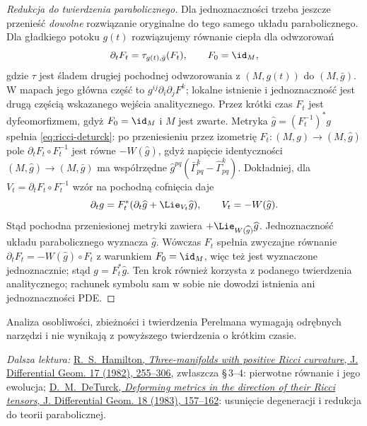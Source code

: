 \begin{proof}[Redukcja do twierdzenia parabolicznego]
Dla jednoznaczności trzeba jeszcze przenieść
\emph{dowolne} rozwiązanie oryginalne do tego samego
układu parabolicznego. Dla gładkiego potoku $g(t)$
rozwiązujemy równanie ciepła dla odwzorowań
\[
 \partial_tF_t=\tau_{g(t),\bar g}(F_t),
 \qquad F_0=\id_M,
\]
gdzie $\tau$ jest śladem drugiej pochodnej
odwzorowania z $(M,g(t))$ do $(M,\bar g)$.
W mapach jego główna część to
$g^{ij}\partial_i\partial_jF^k$; lokalne istnienie
i jednoznaczność jest drugą częścią wskazanego
wejścia analitycznego. Przez krótki czas $F_t$ jest
dyfeomorfizmem, gdyż $F_0=\id_M$ i $M$ jest zwarte.
Metryka $\widehat g=(F_t^{-1})^*g$ spełnia
\eqref{eq:ricci-deturck}: po przeniesieniu przez
izometrię $F_t:(M,g)\to(M,\widehat g)$ pole
$\partial_tF_t\circ F_t^{-1}$ jest równe
$-W(\widehat g)$, gdyż napięcie identyczności
$(M,\widehat g)\to(M,\bar g)$ ma współrzędne
$\widehat g^{pq}(\bar\Gamma^k_{pq}
-\widehat\Gamma^k_{pq})$.
Dokładniej, dla $V_t=\partial_tF_t\circ F_t^{-1}$
wzór na pochodną cofnięcia daje
\[
 \partial_tg=F_t^*(\partial_t\widehat g
                       +\Lie_{V_t}\widehat g),
 \qquad V_t=-W(\widehat g).
\]
Stąd pochodna przeniesionej metryki zawiera
$+\Lie_{W(\widehat g)}\widehat g$.
Jednoznaczność układu parabolicznego wyznacza
$\widehat g$. Wówczas $F_t$ spełnia zwyczajne
równanie $\partial_tF_t=-W(\widehat g)\circ F_t$
z warunkiem $F_0=\id_M$, więc też jest wyznaczone
jednoznacznie; stąd $g=F_t^*\widehat g$.
Ten krok również
korzysta z podanego twierdzenia analitycznego;
rachunek symbolu sam w sobie nie dowodzi istnienia
ani jednoznaczności PDE.
\end{proof}

Analiza osobliwości, zbieżności i twierdzenia Perelmana
wymagają odrębnych narzędzi i nie wynikają z powyższego
twierdzenia o krótkim czasie.

\par\smallskip
{\footnotesize\noindent\emph{Dalsza lektura:}
\href{https://projecteuclid.org/journals/journal-of-differential-geometry/volume-17/issue-2/Three-manifolds-with-positive-Ricci-curvature/10.4310/jdg/1214436922.full}
{R.\ S.\ Hamilton, \emph{Three-manifolds with positive Ricci
curvature}, J. Differential Geom. 17 (1982), 255--306},
zwłaszcza \S\,3--4: pierwotne równanie i jego ewolucja;
\href{https://projecteuclid.org/journals/journal-of-differential-geometry/volume-18/issue-1/Deforming-metrics-in-the-direction-of-their-Ricci-tensors/10.4310/jdg/1214509286.full}
{D.\ M.\ DeTurck, \emph{Deforming metrics in the direction
of their Ricci tensors}, J. Differential Geom. 18 (1983),
157--162}: usunięcie degeneracji i redukcja do teorii
parabolicznej.\par}
